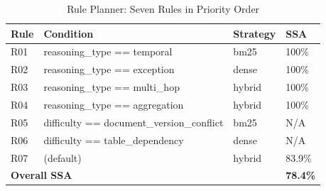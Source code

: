 \documentclass[12pt, a4paper, twoside]{report}
\begin{document}
\begin{table}[H]
\centering
\caption{Rule Planner: Seven Rules in Priority Order}
\label{tab:app_rules}
\begin{tabular}{llll}
\toprule
\textbf{Rule} & \textbf{Condition} & \textbf{Strategy} & \textbf{SSA} \\
\midrule
R01 & reasoning\_type == temporal & bm25   & 100\% \\
R02 & reasoning\_type == exception & dense  & 100\% \\
R03 & reasoning\_type == multi\_hop & hybrid & 100\% \\
R04 & reasoning\_type == aggregation & hybrid & 100\% \\
R05 & difficulty == document\_version\_conflict & bm25   & N/A \\
R06 & difficulty == table\_dependency & dense  & N/A \\
R07 & (default) & hybrid & 83.9\% \\
\midrule
\multicolumn{3}{l}{\textbf{Overall SSA}} & \textbf{78.4\%} \\
\bottomrule
\end{tabular}
\end{table}


\cleardoublepage

\end{document}
